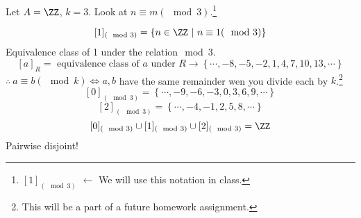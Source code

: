 \begin{example}
Let $A=\ZZ$, $k=3$. Look at $n\equiv m (\mod 3)$.\footnote{$[1]_{(\mod 3)}$ $\leftarrow$ We will use this notation in class.}

\[ [1]_{(\mod 3)} = \left\{ n\in\ZZ\ |\ n\equiv 1 (\mod 3) \right\}\]
Equivalence class of 1 under the relation$\mod 3$.
\[ [a]_R = \text{ equivalence class of $a$ under $R$} \to \left\{\cdots,-8,-5,-2,1,4,7,10,13,\cdots \right\} \]
$\therefore\ a\equiv b(\mod k) \iff a,b$ have the same remainder wen you divide each by $k$.\footnote{This will be a part of a future homework assignment.}
\[ [0]_{(\mod 3)} = \left\{ \cdots,-9,-6,-3,0,3,6,9,\cdots \right\} \]
\[ [2]_{(\mod 3)} = \left\{ \cdots,-4,-1,2,5,8,\cdots \right\} \]
\[ [0]_{(\mod 3)} \cup [1]_{(\mod 3)} \cup [2]_{(\mod 3)} = \ZZ \]
Pairwise disjoint!
\end{example}


